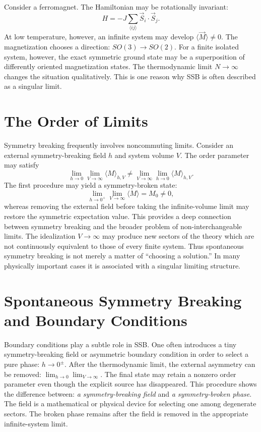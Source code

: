 Consider a ferromagnet. The Hamiltonian may be rotationally invariant:
\[H=-J\sum_{\langle ij\rangle}\vec{S}_i\cdot\vec{S}_j.\]
At low temperature, however, an infinite system may develop
$\langle\vec{M}\rangle\neq0$.
The magnetization chooses a direction:
$SO(3)\rightarrow SO(2)$.
For a finite isolated system, however, the exact symmetric ground state may be
a superposition of differently oriented magnetization states.
The thermodynamic limit $N\rightarrow\infty$ changes the situation qualitatively.
This is one reason why SSB is often described as a singular limit.

\section{ The Order of Limits}
Symmetry breaking frequently involves noncommuting limits.
Consider an external symmetry-breaking field $h$ and system volume $V$.
The order parameter may satisfy
\[\lim_{h\rightarrow0}\lim_{V\rightarrow\infty}\langle M\rangle_{h,V}
\neq\lim_{V\rightarrow\infty}\lim_{h\rightarrow0}\langle M\rangle_{h,V}.\]
The first procedure may yield a symmetry-broken state:
\[\lim_{h\to0^+}\lim_{V\to\infty}\langle M\rangle=M_0\neq0,\]
whereas removing the external field before taking the infinite-volume limit may
restore the symmetric expectation value.
This provides a deep connection between symmetry breaking and the broader
problem of non-interchangeable limits.
The idealization $V\rightarrow\infty$
may produce new sectors of the theory which are not continuously equivalent 
to those of every finite system.
Thus spontaneous symmetry breaking is not merely a matter of ``choosing a solution.''
In many physically important cases it is associated with a singular 
limiting structure.

\section{ Spontaneous Symmetry Breaking and Boundary Conditions}
Boundary conditions play a subtle role in SSB.
One often introduces a tiny symmetry-breaking field or asymmetric boundary
condition in order to select a pure phase: $h\rightarrow 0^\pm$.
After the thermodynamic limit, the external asymmetry can be removed:
$\lim_{h\to0}\lim_{V\to\infty}$.
The final state may retain a nonzero order parameter even though the explicit
source has disappeared.
This procedure shows the difference between: \emph{a symmetry-breaking field}
and \emph{a symmetry-broken phase}.
The field is a mathematical or physical device for selecting one among 
degenerate sectors. The broken phase remains after the field is removed in the
appropriate infinite-system limit.

